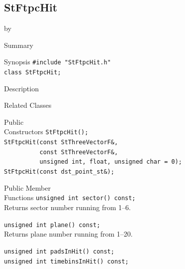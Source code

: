 \documentclass[twoside]{article}
\newcommand{\entrylabel}[1]{\mbox{\textbf{{#1}}}\hfil}%
\newenvironment{entry}
{\begin{list}{}%
    {\renewcommand{\makelabel}{\entrylabel}%
     \setlength{\labelwidth}{90pt}%
     \setlength{\leftmargin}{\labelwidth}
     \advance\leftmargin by \labelsep%
      }%
    }%
  {\end{list}}
\newcommand{\Entrylabel}[1]%
{\raisebox{0pt}[1ex][0pt]{\makebox[\labelwidth][l]%
    {\parbox[t]{\labelwidth}{\hspace{0pt}\textbf{{#1}}}}}}
\newenvironment{Entry}%
{\renewcommand{\entrylabel}{\Entrylabel}\begin{entry}}%
  {\end{entry}}
\begin{document}
\subsection{StFtpcHit}
\label{sec:StFtpcHit}
\begin{Entry}
\item[Summary]
\item[Synopsis]
    \verb+#include "StFtpcHit.h"+\\
    \verb+class StFtpcHit;+\\
\item[Description]
\item[Related Classes]
\item[Public\\ Constructors]
    \verb+StFtpcHit();+\\

    \verb+StFtpcHit(const StThreeVectorF&,+\\
    \verb+          const StThreeVectorF&,+\\
    \verb+          unsigned int, float, unsigned char = 0);+\\

    \verb+StFtpcHit(const dst_point_st&);+\\
\item[Public Member\\ Functions]
    \verb+unsigned int sector() const;+\\
    Returns sector number running from 1--6.
    
    \verb+unsigned int plane() const;+\\
    Returns plane number running from 1--20.      

    \verb+unsigned int padsInHit() const;+\\
    \verb+unsigned int timebinsInHit() const;+\\
\end{Entry}
\clearpage
\end{document}
